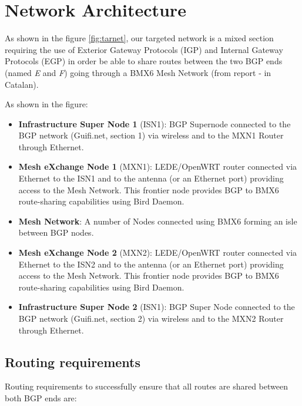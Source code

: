 \chapter{Network Architecture}
\label{ch:architecture}

As shown in the figure \ref{fig:tarnet}, our targeted network is a mixed section requiring the use of Exterior Gateway Protocols (IGP) and Internal Gateway Protocols (EGP) in order be able to share routes between the two BGP ends (named \textit{E} and \textit{F}) going through a BMX6 Mesh Network (from report \cite{bgpbmx6} - in Catalan). 

As shown in the figure:
\begin{itemize}
    \item \textbf{Infrastructure Super Node 1} (ISN1): BGP Supernode connected to the BGP network (Guifi.net, section 1) via wireless and to the MXN1 Router through Ethernet.     
    \item \textbf{Mesh eXchange Node 1} (MXN1): LEDE/OpenWRT router connected via Ethernet to the ISN1 and to the antenna (or an Ethernet port) providing access to the Mesh Network. This frontier node provides BGP to BMX6 route-sharing capabilities using Bird Daemon.
    \item \textbf{Mesh Network}: A number of Nodes connected using BMX6 forming an isle between BGP nodes.
    \item \textbf{Mesh eXchange Node 2} (MXN2): LEDE/OpenWRT router connected via Ethernet to the ISN2 and to the antenna (or an Ethernet port) providing access to the Mesh Network. This frontier node provides BGP to BMX6 route-sharing capabilities using Bird Daemon.
    \item \textbf{Infrastructure Super Node 2} (ISN1): BGP Super Node connected to the BGP network (Guifi.net, section 2) via wireless and to the MXN2 Router through Ethernet.
\end{itemize}


\section{Routing requirements}
Routing requirements to successfully ensure that all routes are shared between both BGP ends are:

